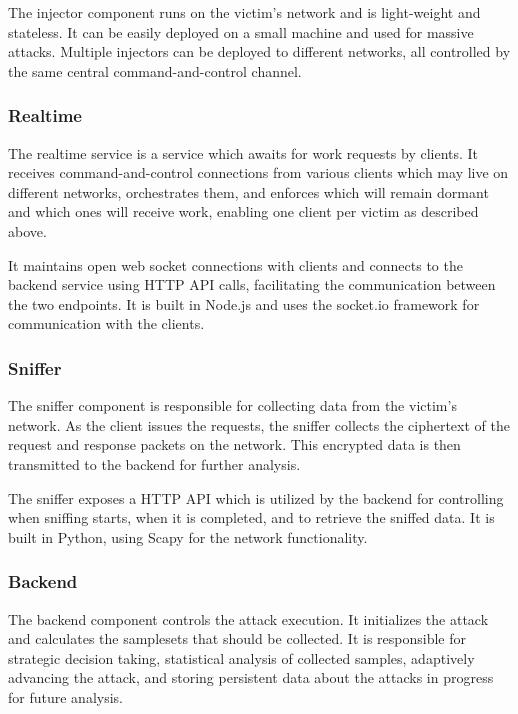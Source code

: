 The injector component runs on the victim's network and is light-weight and
stateless. It can be easily deployed on a small machine and used for massive
attacks. Multiple injectors can be deployed to different networks, all
controlled by the same central command-and-control channel.

\subsubsection{Realtime}

The realtime service is a service which awaits for work requests by clients. It
receives command-and-control connections from various clients which may live on
different networks, orchestrates them, and enforces which will remain dormant
and which ones will receive work, enabling one client per victim as described above.

It maintains open web socket connections with clients and connects to the
backend service using HTTP API calls, facilitating the communication between the
two endpoints. It is built in Node.js \cite{tilkov2010node} and uses the
socket.io framework \cite{rai2013socket} for communication with the clients.

\subsubsection{Sniffer}

The sniffer component is responsible for collecting data from the victim's
network. As the client issues the requests, the sniffer collects the ciphertext
of the request and response packets on the network. This encrypted data is then
transmitted to the backend for further analysis.

The sniffer exposes a HTTP API which is utilized by the backend for controlling
when sniffing starts, when it is completed, and to retrieve the sniffed data. It
is built in Python, using Scapy \cite{biondi2010scapy} for the network functionality.

\subsubsection{Backend}

The backend component controls the attack execution. It initializes the attack
and calculates the samplesets that should be collected. It is responsible for
strategic decision taking, statistical analysis of collected samples, adaptively
advancing the attack, and storing persistent data about the attacks in progress
for future analysis.

